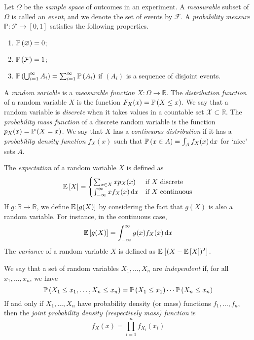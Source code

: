 Let \( \Omega \) be the \textit{sample space} of outcomes in an experiment.
A \textit{measurable} subset of \( \Omega \) is called an \textit{event}, and we denote the set of events by \( \mathcal F \).
A \textit{probability measure} \( \mathbb P \colon \mathcal F \to [0,1] \) satisfies the following properties.
\begin{enumerate}
	\item \( \mathbb{P}\left({\varnothing}\right) = 0 \);
	\item \( \mathbb{P}\left({\mathcal F}\right) = 1 \);
	\item \( \mathbb{P}\left({\bigcup_{i = 1}^\infty A_i}\right) = \sum_{i=1}^\infty \mathbb{P}\left({A_i}\right) \) if \( (A_i) \) is a sequence of disjoint events.
\end{enumerate}
A \textit{random variable} is a \textit{measurable function} \( X \colon \Omega \to \mathbb R \).
The \textit{distribution function} of a random variable \( X \) is the function \( F_X(x) = \mathbb{P}\left({X \leq x}\right) \).
We say that a random variable is \textit{discrete} when it takes values in a countable set \( \mathcal X \subset \mathbb R \).
The \textit{probability mass function} of a discrete random variable is the function \( p_X(x) = \mathbb{P}\left({X = x}\right) \).
We say that \( X \) has a \textit{continuous distribution} if it has a \textit{probability density function} \( f_X(x) \) such that \( \mathbb{P}\left({x \in A}\right) = \int_A f_X(x) \dd{x} \) for `nice' sets \( A \).

The \textit{expectation} of a random variable \( X \) is defined as
\[ \mathbb{E}\left[{X}\right] = \begin{cases}
	\sum_{x \in X} x p_X(x) & \text{if } X \text{ discrete} \\
	\int_{-\infty}^\infty x f_X(x) \dd{x} & \text{if } X \text{ continuous}
\end{cases} \]
If \( g \colon \mathbb R \to \mathbb R \), we define \( \mathbb{E}\left[{g(X)}\right] \) by considering the fact that \( g(X) \) is also a random variable.
For instance, in the continuous case,
\[ \mathbb{E}\left[{g(X)}\right] = \int_{-\infty}^\infty g(x) f_X(x) \dd{x} \]
The \textit{variance} of a random variable \( X \) is defined as \( \mathbb{E}\left[{(X - \mathbb{E}\left[{X}\right])^2}\right] \).

We say that a set of random variables \( X_1, \dots, X_n \) are \textit{independent} if, for all \( x_1, \dots, x_n \), we have
\[ \mathbb{P}\left({X_1 \leq x_1, \dots, X_n \leq x_n}\right) = \mathbb{P}\left({X_1 \leq x_1}\right) \cdots \mathbb{P}\left({X_n \leq x_n}\right) \]
If and only if \( X_1, \dots, X_n \) have probability density (or mass) functions \( f_1, \dots, f_n \), then the \textit{joint probability density (respectively mass) function} is
\[ f_X(x) = \prod_{i = 1}^n f_{X_i}(x_i) \]

